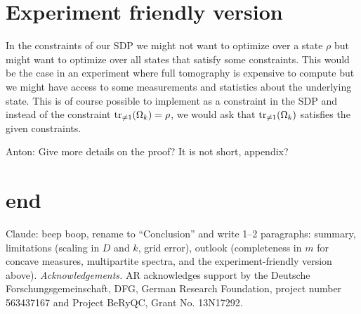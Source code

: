\documentclass[aps,pra,twocolumn,showpacs,superscriptaddress,groupedaddress]{revtex4-2}
\newcommand{\anton}[1]{{\color{antongreen} Anton: #1}}
\newcommand{\claude}[1]{{\color{claudeorange} Claude: beep boop, #1}}
\begin{document}
\section{Experiment friendly version}
In the constraints of our SDP we might not want to optimize over a state $\rho$ but might want to optimize over all states that satisfy some constraints. This would be the case in an experiment where full tomography is expensive to compute but we might have access to some measurements and statistics about the underlying state. This is of course possible to implement as a constraint in the SDP and instead of the constraint $\tr_{\neq 1}(\Omega_k) = \rho$, we would ask that $\tr_{\neq 1}(\Omega_k)$ satisfies the given constraints.

\anton{Give more details on the proof? It is not short, appendix?}
\fi

\section{end}
\claude{rename to ``Conclusion'' and write 1--2 paragraphs: summary, limitations (scaling in $D$ and $k$, grid error), outlook (completeness in $m$ for concave measures, multipartite spectra, and the experiment-friendly version above).}
{\em Acknowledgements.}
AR acknowledges support
by the Deutsche Forschungsgemeinschaft, DFG, German Research Foundation, project number 563437167 and Project BeRyQC, Grant No.
13N17292.



\newpage
\bigskip




{}
\end{document}
